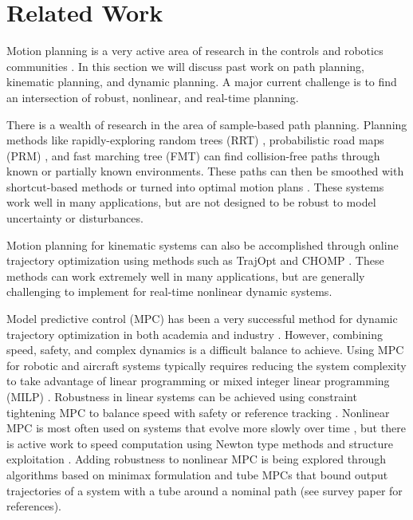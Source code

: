 \section{Related Work \label{sec:relatedwork}}
Motion planning is a very active area of research in the controls and robotics communities \cite{Hoy2015}.  In this section we will discuss past work on path planning, kinematic planning, and dynamic planning.  A major current challenge is to find an intersection of robust, nonlinear, and real-time planning. 

There is a wealth of research in the area of sample-based path planning.  Planning methods like rapidly-exploring random trees (RRT) \cite{Kuffner2000}, probabilistic road maps (PRM) \cite{Kavraki1996}, and fast marching tree (FMT) \cite{Janson2015} can find collision-free paths through known or partially known environments.  These paths can then be smoothed with shortcut-based methods or turned into optimal motion plans \cite{Richter2016, Karaman2011, Kobilarov2012}.  These systems work well in many applications, but are not designed to be robust to model uncertainty or disturbances.

Motion planning for kinematic systems can also be accomplished through online trajectory optimization using methods such as TrajOpt \cite{Schulman2013} and CHOMP \cite{Ratliff2009}. These methods can work extremely well in many applications, but are generally challenging to implement for real-time nonlinear dynamic systems.

Model predictive control (MPC) has been a very successful method for dynamic trajectory optimization in both academia and industry \cite{Qin2003}.  However, combining speed, safety, and complex dynamics is a difficult balance to achieve. Using MPC for robotic and aircraft systems typically requires reducing the system complexity to take advantage of linear programming or mixed integer linear programming (MILP) \cite{Alexis2016, Bellingham2002, Vitus2008, Zeilinger2011, Richter2012}. Robustness in linear systems can be achieved using constraint tightening MPC to balance speed with safety \cite{Kuwata2007, Richards2006} or reference tracking \cite{DiCairano2016}. Nonlinear MPC is most often used on systems that evolve more slowly over time \cite{Diehl2002, Schildbach2016}, but there is active work to speed computation using Newton type methods and structure exploitation \cite{Diehl2009, Quirynen2015, Grune2011, Neunert2016}. Adding robustness to nonlinear MPC is being explored through algorithms based on minimax formulation and tube MPCs that bound output trajectories of a system with a tube around a nominal path (see survey paper \cite{Hoy2015} for references).

